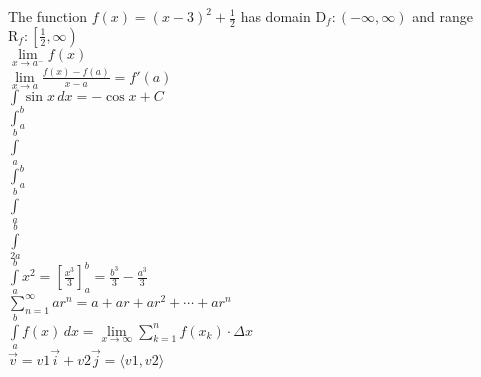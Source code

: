 \documentclass[11pt]{article}
\begin{document}
The function $f(x)=(x-3)^2+\frac{1}{2}$ has domain $\mathrm{D}_f:(-\infty, \infty)$ and range $\mathrm{R}_f:\left[\frac{1}{2}, \infty\right)$  \\ %

$\lim\limits_{x \to a^-} f(x)$ \\

$\displaystyle{\lim\limits_{x \to a} \frac{f(x)-f(a)}{x-a} = f'(a)}$ \\ %

$\displaystyle{\int \sin x \, dx = -\cos x +C}$ \\

$\int_a^b$ \\

$\int \limits_a^b$ \\

$\displaystyle{\int_a^b}$ \\

$\displaystyle{\int \limits_a^b}$ \\

$\displaystyle{\int \limits_{2a}^{b}}$ \\

$\displaystyle{\int \limits_{a}^{b} x^2 = \left[\frac{x^3}{3} \right]_a^b = \frac{b^3}{3} - \frac{a^3}{3}}$ \\

$\displaystyle{\sum \limits_{n=1}^{\infty} ar^n = a + ar + ar^2 + \cdots + ar^n }$ \\

$\displaystyle{\int \limits _a^b f(x) \, dx = \lim \limits_{x \to \infty} \sum \limits_{k=1}^n f(x_k) \cdot \Delta x}$ \\ 

$\vec{v} = v1 \vec{i} + v2 \vec{j} = \langle v1, v2 \rangle$
\end{document}
